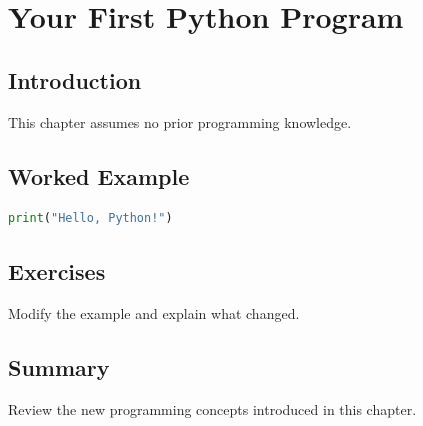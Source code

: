 \chapter{Your First Python Program}
\label{chap:vol3-2}



\section{Introduction}
This chapter assumes no prior programming knowledge.

\section{Worked Example}
\begin{lstlisting}[language=Python]
print("Hello, Python!")
\end{lstlisting}

\section{Exercises}
\begin{exercise}
Modify the example and explain what changed.
\end{exercise}

\section{Summary}
Review the new programming concepts introduced in this chapter.
